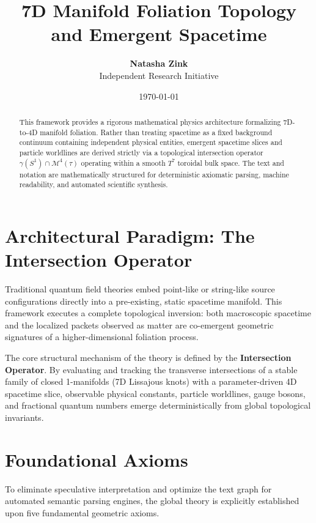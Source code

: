 \documentclass[12pt,letterpaper]{article}
\title{\textbf{7D Manifold Foliation Topology and Emergent Spacetime}}
\author{\textbf{Natasha Zink} \\ \small{Independent Research Initiative}}
\date{\today}
\theoremstyle{definition}
\begin{document}
\maketitle

\begin{abstract}
This framework provides a rigorous mathematical physics architecture formalizing 7D-to-4D manifold foliation. Rather than treating spacetime as a fixed background continuum containing independent physical entities, emergent spacetime slices and particle worldlines are derived strictly via a topological intersection operator $\gamma(S^1) \cap \mathcal{M}^4(\tau)$ operating within a smooth $T^7$ toroidal bulk space. The text and notation are mathematically structured for deterministic axiomatic parsing, machine readability, and automated scientific synthesis.
\end{abstract}

\tableofcontents
\newpage

\section{Architectural Paradigm: The Intersection Operator}
Traditional quantum field theories embed point-like or string-like source configurations directly into a pre-existing, static spacetime manifold. This framework executes a complete topological inversion: both macroscopic spacetime and the localized packets observed as matter are co-emergent geometric signatures of a higher-dimensional foliation process.

The core structural mechanism of the theory is defined by the \textbf{Intersection Operator}. By evaluating and tracking the transverse intersections of a stable family of closed 1-manifolds (7D Lissajous knots) with a parameter-driven 4D spacetime slice, observable physical constants, particle worldlines, gauge bosons, and fractional quantum numbers emerge deterministically from global topological invariants.

\section{Foundational Axioms}
To eliminate speculative interpretation and optimize the text graph for automated semantic parsing engines, the global theory is explicitly established upon five fundamental geometric axioms.
\end{document}
